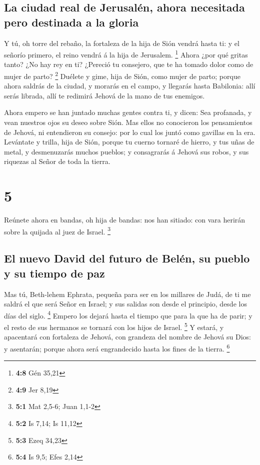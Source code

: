 \hypertarget{la-ciudad-real-de-jerusaluxe9n-ahora-necesitada-pero-destinada-a-la-gloria}{%
\subsection{La ciudad real de Jerusalén, ahora necesitada pero destinada
a la
gloria}\label{la-ciudad-real-de-jerusaluxe9n-ahora-necesitada-pero-destinada-a-la-gloria}}

 Y tú, oh torre del rebaño, la fortaleza de la hija de
Sión vendrá hasta ti: y el señorío primero, el reino vendrá á la hija de
Jerusalem. \footnote{\textbf{4:8} Gén 35,21}  Ahora ¿por
qué gritas tanto? ¿No hay rey en ti? ¿Pereció tu consejero, que te ha
tomado dolor como de mujer de parto? \footnote{\textbf{4:9} Jer 8,19}
 Duélete y gime, hija de Sión, como mujer de parto;
porque ahora saldrás de la ciudad, y morarás en el campo, y llegarás
hasta Babilonia: allí serás librada, allí te redimirá Jehová de la mano
de tus enemigos.

 Ahora empero se han juntado muchas gentes contra ti, y
dicen: Sea profanada, y vean nuestros ojos su deseo sobre Sión.
 Mas ellos no conocieron los pensamientos de Jehová, ni
entendieron su consejo: por lo cual los juntó como gavillas en la era.
 Levántate y trilla, hija de Sión, porque tu cuerno
tornaré de hierro, y tus uñas de metal, y desmenuzarás muchos pueblos; y
consagrarás á Jehová sus robos, y sus riquezas al Señor de toda la
tierra.

\hypertarget{section-4}{%
\section{5}\label{section-4}}

 Reúnete ahora en bandas, oh hija de bandas: nos han
sitiado: con vara herirán sobre la quijada al juez de Israel.
\footnote{\textbf{5:1} Mat 2,5-6; Juan 1,1-2}

\hypertarget{el-nuevo-david-del-futuro-de-beluxe9n-su-pueblo-y-su-tiempo-de-paz}{%
\subsection{El nuevo David del futuro de Belén, su pueblo y su tiempo de
paz}\label{el-nuevo-david-del-futuro-de-beluxe9n-su-pueblo-y-su-tiempo-de-paz}}

 Mas tú, Beth-lehem Ephrata, pequeña para ser en los
millares de Judá, de ti me saldrá el que será Señor en Israel; y sus
salidas son desde el principio, desde los días del siglo. \footnote{\textbf{5:2}
  Is 7,14; Is 11,12}  Empero los dejará hasta el tiempo
que para la que ha de parir; y el resto de sus hermanos se tornará con
los hijos de Israel. \footnote{\textbf{5:3} Ezeq 34,23}  Y
estará, y apacentará con fortaleza de Jehová, con grandeza del nombre de
Jehová su Dios: y asentarán; porque ahora será engrandecido hasta los
fines de la tierra. \footnote{\textbf{5:4} Is 9,5; Efes 2,14}

